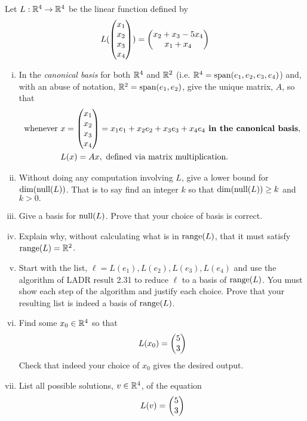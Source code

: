 \begin{question}
    \normalfont
    Let $L:\mathbb R^4\rightarrow\mathbb R^4$ be the linear function defined by
    \begin{equation}
        L(\begin{pmatrix} x_1\\ x_2\\x_3 \\ x_4\end{pmatrix})=\begin{pmatrix} x_2+x_3-5x_4\\ x_1+x_4\end{pmatrix}
    \end{equation}
    \begin{enumerate}[(i)]
        \item In the \textit{canonical basis} for both $\mathbb R^4$ and $\mathbb R^2$ (i.e. $\mathbb R^4=\textnormal{span}({e_1,e_2,e_3,e_4})$) and, with an abuse of notation, $\mathbb R^2=\textnormal{span}({e_1,e_2})$, give the unique matrix, $A$, so that 
        \[
            \begin{aligned}
                \text{whenever }&x=\begin{pmatrix} x_1\\ x_2\\x_3 \\ x_4\end{pmatrix}=x_1e_1+x_2e_2+x_3e_3+x_4e_4\textbf{ in the canonical basis},\\
                &L(x)=Ax,\text{ defined via matrix multiplication.}
            \end{aligned}
        \]
        \item Without doing any computation involving $L$, give a lower bound for $\textnormal{dim}(\textnormal{null}(L))$. That is to say find an integer $k$ so that $\textnormal{dim}(\textnormal{null}(L))\geq k$ and $k>0.$
        \item Give a basis for $\textnormal{null}(L)$. Prove that your choice of basis is correct.
        \item Explain why, without calculating what is in $\textnormal{range}(L)$, that it must satisfy $\textnormal{range}(L)=\mathbb R^2$.
        \item Start with the list, $\ell={L(e_1),L(e_2),L(e_3),L(e_4)}$ and use the algorithm of LADR result 2.31 to reduce $\ell$ to a basis of $\textnormal{range}(L)$. You must show each step of the algorithm and justify each choice. Prove that your resulting list is indeed a basis of $\textnormal{range}(L)$.
        \item Find some $x_0\in\mathbb R^4$ so that 
        \[
            \begin{aligned}
                L(x_0)=\begin{pmatrix} 5\\ 3\end{pmatrix}
            \end{aligned}
        \]
        Check that indeed your choice of $x_0$ gives the desired output.
        \item List all possible solutions, $v\in\mathbb R^4$, of the equation 
        \[
            \begin{aligned}
                L(v)=\begin{pmatrix} 5\\ 3\end{pmatrix}
            \end{aligned}
        \]
    \end{enumerate}
\end{question}